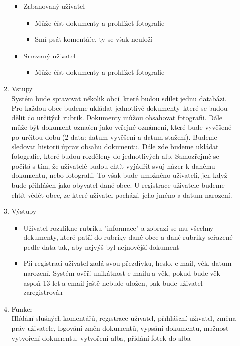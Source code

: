 \documentclass[12pt]{article}
\begin{document}
\begin{enumerate}
\begin{enumerate}[label*=\arabic*.]
\begin{itemize}
			\item Zabanovaný uživatel
				\begin{itemize}
					\item Může číst dokumenty a prohlížet fotografie
					\item Smí psát komentáře, ty se však neuloží
				\end{itemize}	
			\item Smazaný uživatel
				\begin{itemize}
					\item Může číst dokumenty a prohlížet fotografie
				\end{itemize}		
			\end{itemize}
		\item Vstupy\\
		Systém bude spravovat několik obcí, které budou sdílet jednu databázi. Pro každou obec budeme ukládat jednotlivé dokumenty, které se budou dělit do určitých rubrik. Dokumenty můžou obsahovat fotografii. Dále může být dokument označen jako veřejné oznámení, které bude vyvěšené po určitou dobu (2 data: datum vyvěšení a datum stažení). Budeme sledovat historii úprav obsahu dokumentu. Dále zde budeme ukládat fotografie, které budou rozděleny do jednotlivých alb. Samozřejmě se počítá s tím, že uživatelé budou chtít vyjádřit svůj názor k danému dokumentu, nebo fotografii. To však bude umožněno uživateli, jen když bude přihlášen jako obyvatel dané obce. U registrace uživatele budeme chtít vědět obec, ze které uživatel pochází, jeho jméno a datum narození.
		\item Výstupy 
			\begin{itemize}
				\item Uživatel rozklikne rubriku "informace" a zobrazí se mu všechny dokumenty, které patří do rubriky dané obce a dané rubriky seřazené podle data tak, aby nejvýš byl nejnovější dokument
				\item Při registraci uživatel zadá svou přezdívku, heslo, e-mail, věk, datum narození. Systém ověří unikátnost e-mailu a věk, pokud bude věk aspoň 13 let a email ještě nebude uložen, pak bude
				uživatel zaregistrován
			\end{itemize}
		\item Funkce \\
			Hlídání slušných komentářů, registrace uživatel, přihlášení uživatel, změna práv uživatele, logování změn dokumentů, vypsání dokumentu, možnost vytvoření dokumentu, vytvoření alba, přidání fotek do alba
		\end{enumerate}
	\newpage

\end{enumerate}
\end{document}
